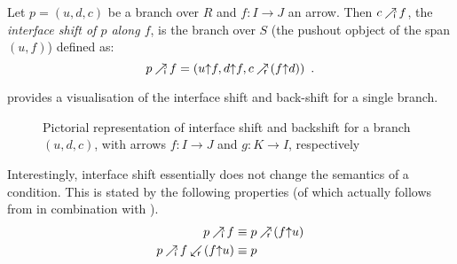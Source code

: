 \begin{definition}
    Let $p=(u,d,c)$ be a branch over $R$ and $f: I\to J$ an arrow. Then $c\mathbin{\nearrow_{\!\!\mathsf i}} f$, the \emph{interface shift of $p$ along $f$}, is the branch over $S$ (the pushout opbject of the span $(u,f)$) defined as:
     \[ p \mathbin{\nearrow_{\!\!\mathsf i}} f = (u\mathord{\uparrow} f,d\mathord{\uparrow} f,c\mathbin{\nearrow_{\!\!\!\mathsf r}} (f\mathord{\uparrow} d)) \enspace. \]
\end{definition}
%
 provides a visualisation of the interface shift and back-shift for a single branch.

\begin{figure}
\centering

\caption{Pictorial representation of interface shift and backshift for a branch $(u,d,c)$, with arrows $f:I\to J$ and $g:K\to I$, respectively}
\end{figure}
%
Interestingly, interface shift essentially does not change the semantics of a condition. This is stated by the following properties (of which  actually follows from  in combination with ).
%
\begin{align}
\eqlabel{Ishift}
p\Ishift f & \equiv p\Rshift (f\po u) \\
\eqlabel{Ishift-Rbshift}
p\Ishift f \Rbshift (f\po u) & \equiv p
\end{align}
